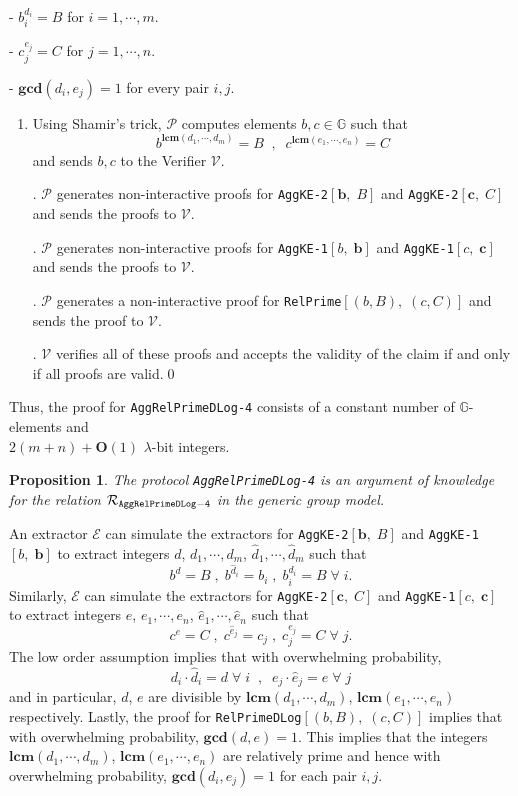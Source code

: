 \documentclass[11pt, lettersize, notitlepage, leqno, footskip=0.6cm]{article}
\newcommand{\mc}{\mathcal}
\newcommand{\mb}{\mathbb}
\newcommand{\mbf}{\mathbf}
\newcommand{\lam}{\lambda}
\newcommand{\what}{\widehat}
\newcommand{\bO}{\mbf{O}}
\newcommand{\mP}{\mc{P}}
\newcommand{\vs}{\vspace{-0.15cm}}
\newcommand{\op}{overwhelming probability}
\newcommand{\LCM}{\mbf{lcm}}
\newcommand{\GCD}{\mbf{gcd}}
\newcommand{\E}{\mc{E}}
\newtheorem{Prop}[Thm]{Proposition}
\numberwithin{equation}{section}
\begin{document}
\noindent - $b_i^{d_i} = B$ for $i = 1,\cdots, m$.

\noindent - $c_j^{e_j} = C$ for $j = 1,\cdots, n$.

\noindent - $\GCD(d_i, e_j) = 1$ for every pair $i, j$.

\begin{enumerate}[wide, labelwidth=!, labelindent=0pt]\vs \item Using Shamir's trick, $\mP$ computes elements $b, c \in \mb{G}$ such that $$b^{\LCM(d_1,\cdots,d_m)} = B\;\; , \;\; c^{\LCM(e_1,\cdots,e_n)} = C$$ and sends $b,c$ to the Verifier $\mc{V}$.

. $\mc{P}$ generates non-interactive proofs for \verb|AggKE-2|$[\mbf{b},\; B]$ and \verb|AggKE-2|$[\mbf{c},\; C]$ and sends the proofs to $\mc{V}$.

. $\mc{P}$ generates non-interactive proofs for \verb|AggKE-1|$[b,\;\mbf{b}]$ and \verb|AggKE-1|$[c,\; \mbf{c}]$ and sends the proofs to $\mc{V}$.

. $\mc{P}$ generates a non-interactive proof for \verb|RelPrime|$[(b,B),\;(c,C)]$ and sends the proof to $\mc{V}$.

. $\mc{V}$ verifies all of these proofs and accepts the validity of the claim if and only if all proofs are valid.\qed \end{enumerate}

\noindent Thus, the proof for \verb|AggRelPrimeDLog-4| consists of a constant number of $\mb{G}$-elements and \\$2(m+n)+\bO(1)$ $\lam$-bit integers.


\begin{Prop} The protocol \verb|AggRelPrimeDLog-4| is an argument of knowledge for the relation $\mc{R}_{\tt{AggRelPrimeDLog-4}}$ in the generic group model.\end{Prop}

\begin{prf} An extractor $\E$ can simulate the extractors for \verb|AggKE-2|$[\mbf{b},\; B]$ and \verb|AggKE-1|$[b,\;\mbf{b}]$ to extract integers $d$, $d_1,\cdots,d_m$, $\what{d}_1,\cdots,\what{d}_m$ such that \vs $$b^d = B\;,\; b^{\what{d}_i}= b_i\;,\; b_i^{d_i}= B\;\forall\; i.$$ Similarly, $\E$ can simulate the extractors for \verb|AggKE-2|$[\mbf{c},\; C]$ and \verb|AggKE-1|$[c,\;\mbf{c}]$ to extract integers $e$, $e_1,\cdots,e_n$, $\what{e}_1,\cdots,\what{e}_n$ such that \vs $$c^e = C\;,\; c^{\what{e}_j}= c_j\;,\;c_j^{e_j}= C\;\forall\; j.$$ The low order assumption implies that with \op,\vs $$d_i\cdot\what{d}_i = d\;\forall\;i\;\;,\;\; e_j\cdot\what{e}_j = e\;\forall\;j$$ and in particular, $d$, $e$ are divisible by $\LCM(d_1,\cdots,d_m)$, $\LCM(e_1,\cdots,e_n)$ respectively. Lastly, the proof for \verb|RelPrimeDLog|$[(b,B),\;(c,C)]$ implies that with \op, $\GCD(d,e) = 1$. This implies that the integers $\LCM(d_1,\cdots,d_m)$, $\LCM(e_1,\cdots,e_n)$ are relatively prime and hence with \op, $\GCD(d_i,e_j) = 1$ for each pair $i,j$. \end{prf}
\end{document}
